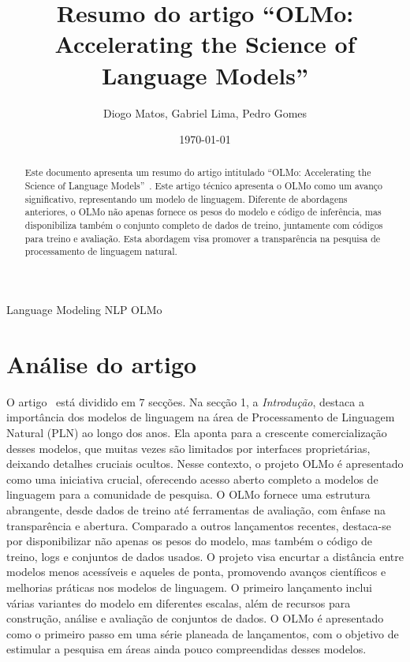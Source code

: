 \documentclass{article}
\title{Resumo do artigo ``OLMo: Accelerating the Science of Language Models''}
\author{Diogo Matos, Gabriel Lima, Pedro Gomes}
\date{\today}
\begin{document}
\maketitle

\begin{center}
    \textbullet \vspace{0.5} Language Modeling   \textbullet\vspace{0.5} NLP  \textbullet\vspace{0.5} OLMo  
\end{center}
    


\begin{abstract}
Este documento apresenta um resumo do artigo intitulado ``OLMo: Accelerating the Science of Language Models''~\cite{OLMo}. Este artigo técnico apresenta o OLMo como um avanço significativo, representando um modelo de linguagem. Diferente de abordagens anteriores, o OLMo não apenas fornece os pesos do modelo e código de inferência, mas disponibiliza também o conjunto completo de dados de treino, juntamente com códigos para treino e avaliação. Esta abordagem visa promover a transparência na pesquisa de processamento de linguagem natural.
\end{abstract}

\section*{Análise do artigo}

O artigo~\cite{OLMo} está dividido em $7$ secções. Na secção 1, a \textit{Introdução}, destaca a importância dos modelos de linguagem na área de Processamento de Linguagem Natural (PLN) ao longo dos anos. Ela aponta para a crescente comercialização desses modelos, que muitas vezes são limitados por interfaces proprietárias, deixando detalhes cruciais ocultos. Nesse contexto, o projeto OLMo é apresentado como uma iniciativa crucial, oferecendo acesso aberto completo a modelos de linguagem para a comunidade de pesquisa. O OLMo fornece uma estrutura abrangente, desde dados de treino até ferramentas de avaliação, com ênfase na transparência e abertura. Comparado a outros lançamentos recentes, destaca-se por disponibilizar não apenas os pesos do modelo, mas também o código de treino, logs e conjuntos de dados usados. O projeto visa encurtar a distância entre modelos menos acessíveis e aqueles de ponta, promovendo avanços científicos e melhorias práticas nos modelos de linguagem. O primeiro lançamento inclui várias variantes do modelo em diferentes escalas, além de recursos para construção, análise e avaliação de conjuntos de dados. O OLMo é apresentado como o primeiro passo em uma série planeada de lançamentos, com o objetivo de estimular a pesquisa em áreas ainda pouco compreendidas desses modelos. 
\end{document}
